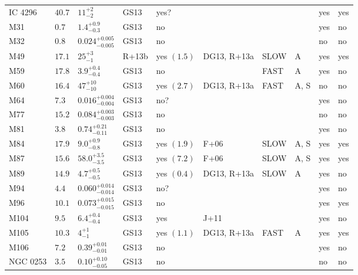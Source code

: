 \begin{table*}
\begin{center}
\begin{tabular}{llllllllll}
IC 4296  &  $40.7$  &  $11_{-2}^{+2}$   &  GS13  &  yes?  &     &      &     &  yes  &  yes  \\ 
M31  &  $0.7$  &  $1.4_{-0.3}^{+0.9}$   &  GS13  &  no   &     &      &     &  yes  &  no  \\ 
M32  &  $0.8$  &  $0.024_{-0.005}^{+0.005}$   &  GS13  &  no   &     &      &     &  no  &  no  \\ 
M49  &  $17.1$  &  $25_{-1}^{+3}$   &  R+13b  &  yes  $(1.5)$  &  DG13, R+13a  &   SLOW  &  A  &  yes  &  yes  \\ 
M59  &  $17.8$  &  $3.9_{-0.4}^{+0.4}$   &  GS13  &  no   &     &  FAST   &  A  &  yes  &  no  \\ 
M60  &  $16.4$  &  $47_{-10}^{+10}$   &  GS13  &  yes  $(2.7)$  &  DG13, R+13a  &  FAST   &  A, S  &  no  &  no  \\ 
M64  &  $7.3$  &  $0.016_{-0.004}^{+0.004}$   &  GS13  &  no?  &     &      &     &  yes  &  no  \\ 
M77  &  $15.2$  &  $0.084_{-0.003}^{+0.003}$   &  GS13  &  no   &     &      &     &  no  &  no  \\ 
M81  &  $3.8$  &  $0.74_{-0.11}^{+0.21}$   &  GS13  &  no   &     &      &     &  yes  &  no  \\ 
M84  &  $17.9$  &  $9.0_{-0.8}^{+0.9}$   &  GS13  &  yes  $(1.9)$  &  F+06  &   SLOW  &  A, S  &  yes  &  yes  \\ 
M87  &  $15.6$  &  $58.0_{-3.5}^{+3.5}$   &  GS13  &  yes  $(7.2)$  &  F+06  &   SLOW  &  A, S  &  yes  &  yes  \\ 
M89  &  $14.9$  &  $4.7_{-0.5}^{+0.5}$   &  GS13  &  yes  $(0.4)$  &  DG13, R+13a  &   SLOW  &  A  &  yes  &  no  \\ 
M94  &  $4.4$  &  $0.060_{-0.014}^{+0.014}$   &  GS13  &  no?  &     &      &     &  yes  &  no  \\ 
M96  &  $10.1$  &  $0.073_{-0.015}^{+0.015}$   &  GS13  &  no   &     &      &     &  yes  &  yes  \\ 
M104  &  $9.5$  &  $6.4_{-0.4}^{+0.4}$   &  GS13  &  yes   &  J+11  &      &     &  yes  &  no  \\ 
M105  &  $10.3$  &  $4_{-1}^{+1}$   &  GS13  &  yes  $(1.1)$  &  DG13, R+13a  &  FAST   &  A  &  yes  &  yes  \\ 
M106  &  $7.2$  &  $0.39_{-0.01}^{+0.01}$   &  GS13  &  no   &     &      &     &  yes  &  no  \\ 
NGC 0253  &  $3.5$  &  $0.10_{-0.05}^{+0.10}$   &  GS13  &  no   &     &      &     &  no  &  no  \\ 

\end{tabular}
\end{center}
\end{table*}
